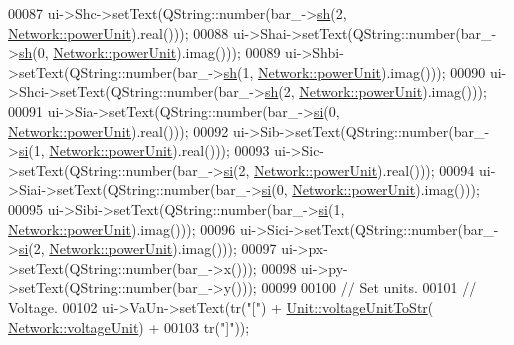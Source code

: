 \begin{DoxyCode}
00087   ui->Shc->setText(QString::number(bar\_->\hyperlink{group___models_gac188071bf5f165b0acdaa4c8af82355c}{sh}(2, \hyperlink{group___graphics_ga9504015bc566f4a3d3b4d4a86000293b}{Network::powerUnit}).real()));
00088   ui->Shai->setText(QString::number(bar\_->\hyperlink{group___models_gac188071bf5f165b0acdaa4c8af82355c}{sh}(0, \hyperlink{group___graphics_ga9504015bc566f4a3d3b4d4a86000293b}{Network::powerUnit}).imag()));
00089   ui->Shbi->setText(QString::number(bar\_->\hyperlink{group___models_gac188071bf5f165b0acdaa4c8af82355c}{sh}(1, \hyperlink{group___graphics_ga9504015bc566f4a3d3b4d4a86000293b}{Network::powerUnit}).imag()));
00090   ui->Shci->setText(QString::number(bar\_->\hyperlink{group___models_gac188071bf5f165b0acdaa4c8af82355c}{sh}(2, \hyperlink{group___graphics_ga9504015bc566f4a3d3b4d4a86000293b}{Network::powerUnit}).imag()));
00091   ui->Sia->setText(QString::number(bar\_->\hyperlink{group___models_ga02bbc279f1e133f66b12ee21e7bebcd8}{si}(0, \hyperlink{group___graphics_ga9504015bc566f4a3d3b4d4a86000293b}{Network::powerUnit}).real()));
00092   ui->Sib->setText(QString::number(bar\_->\hyperlink{group___models_ga02bbc279f1e133f66b12ee21e7bebcd8}{si}(1, \hyperlink{group___graphics_ga9504015bc566f4a3d3b4d4a86000293b}{Network::powerUnit}).real()));
00093   ui->Sic->setText(QString::number(bar\_->\hyperlink{group___models_ga02bbc279f1e133f66b12ee21e7bebcd8}{si}(2, \hyperlink{group___graphics_ga9504015bc566f4a3d3b4d4a86000293b}{Network::powerUnit}).real()));
00094   ui->Siai->setText(QString::number(bar\_->\hyperlink{group___models_ga02bbc279f1e133f66b12ee21e7bebcd8}{si}(0, \hyperlink{group___graphics_ga9504015bc566f4a3d3b4d4a86000293b}{Network::powerUnit}).imag()));
00095   ui->Sibi->setText(QString::number(bar\_->\hyperlink{group___models_ga02bbc279f1e133f66b12ee21e7bebcd8}{si}(1, \hyperlink{group___graphics_ga9504015bc566f4a3d3b4d4a86000293b}{Network::powerUnit}).imag()));
00096   ui->Sici->setText(QString::number(bar\_->\hyperlink{group___models_ga02bbc279f1e133f66b12ee21e7bebcd8}{si}(2, \hyperlink{group___graphics_ga9504015bc566f4a3d3b4d4a86000293b}{Network::powerUnit}).imag()));
00097   ui->px->setText(QString::number(bar\_->x()));
00098   ui->py->setText(QString::number(bar\_->y()));
00099 
00100   \textcolor{comment}{// Set units.}
00101   \textcolor{comment}{// Voltage.}
00102   ui->VaUn->setText(tr(\textcolor{stringliteral}{"["}) + \hyperlink{class_unit_a7fa103c31f9f069961b35b6371ff0c0a}{Unit::voltageUnitToStr}(
      \hyperlink{group___graphics_gacde031ef95f5c05565ee35769f2ed89e}{Network::voltageUnit}) +
00103                     tr(\textcolor{stringliteral}{"]"}));

\end{DoxyCode}
